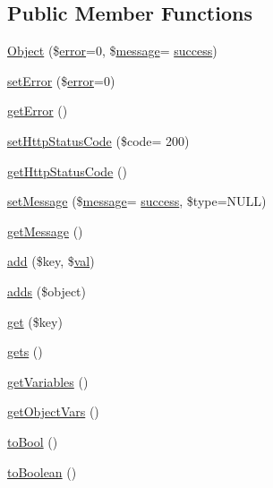 \subsection*{Public Member Functions}
\begin{DoxyCompactItemize}
\item 
\hyperlink{classObject_a9c1f4bf33208a5c858c0722afce90f30}{Object} (\$\hyperlink{common_2js_2jquery_8js_ad9c7b7332a24ed93fb21cd053c99bd12}{error}=0, \$\hyperlink{classmessage}{message}= \textquotesingle{}\hyperlink{jquery_8oembed_8js_a20d50bae920793dd76c2f5b4c6fd9803}{success}\textquotesingle{})
\item 
\hyperlink{classObject_a12f7ac70214558a1774ca010865c798e}{set\+Error} (\$\hyperlink{common_2js_2jquery_8js_ad9c7b7332a24ed93fb21cd053c99bd12}{error}=0)
\item 
\hyperlink{classObject_a2aaced460a018edd69bf17813d6c48df}{get\+Error} ()
\item 
\hyperlink{classObject_a56a37e14694356404f793dd0ab02e2af}{set\+Http\+Status\+Code} (\$code= \textquotesingle{}200\textquotesingle{})
\item 
\hyperlink{classObject_a5cb4abc24dd01e04c24da487d476efc0}{get\+Http\+Status\+Code} ()
\item 
\hyperlink{classObject_a28eb2a0ea4a14ff617d78505c38c906c}{set\+Message} (\$\hyperlink{classmessage}{message}= \textquotesingle{}\hyperlink{jquery_8oembed_8js_a20d50bae920793dd76c2f5b4c6fd9803}{success}\textquotesingle{}, \$type=N\+U\+LL)
\item 
\hyperlink{classObject_a813487b153bfe18102ac76d8c718999f}{get\+Message} ()
\item 
\hyperlink{classObject_a4f8a7fa8794663b7625fc15c9589797b}{add} (\$key, \$\hyperlink{ckeditor_2js_2xe__interface_8js_a4fb96abdf073a439bca5e051c333b35d}{val})
\item 
\hyperlink{classObject_a6dbae38facc1000561b8b230847aaca1}{adds} (\$object)
\item 
\hyperlink{classObject_ae6dff49b7ab68822bdb4ce6940c10d3f}{get} (\$key)
\item 
\hyperlink{classObject_ad6f51071a4048c1fed581748065e4d68}{gets} ()
\item 
\hyperlink{classObject_ad33c509ec041fb43c6e25f8155577925}{get\+Variables} ()
\item 
\hyperlink{classObject_afe1fe6fc005389cd616a5e9105de977a}{get\+Object\+Vars} ()
\item 
\hyperlink{classObject_a409216fd5ab386b1e78e311440113f75}{to\+Bool} ()
\item 
\hyperlink{classObject_afafb45098e163c179940c7e1ddc67fe2}{to\+Boolean} ()
\end{DoxyCompactItemize}
